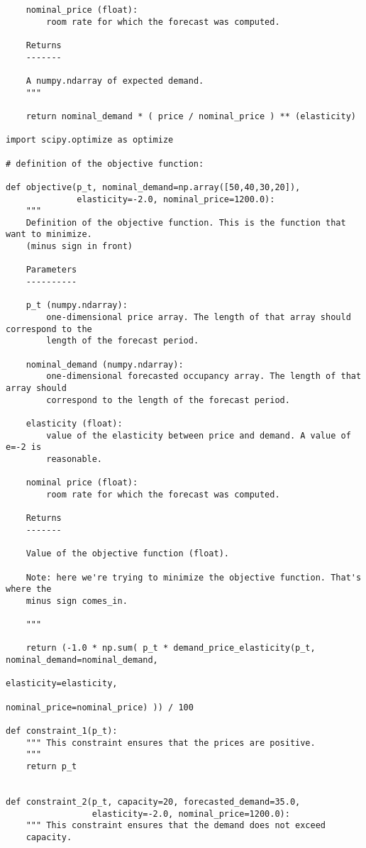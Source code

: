 \begin{verbatim}
    nominal_price (float):
        room rate for which the forecast was computed.

    Returns
    -------

    A numpy.ndarray of expected demand.
    """

    return nominal_demand * ( price / nominal_price ) ** (elasticity)

import scipy.optimize as optimize

# definition of the objective function:

def objective(p_t, nominal_demand=np.array([50,40,30,20]),
              elasticity=-2.0, nominal_price=1200.0):
    """
    Definition of the objective function. This is the function that want to minimize.
    (minus sign in front)

    Parameters
    ----------

    p_t (numpy.ndarray):
        one-dimensional price array. The length of that array should correspond to the
        length of the forecast period.

    nominal_demand (numpy.ndarray):
        one-dimensional forecasted occupancy array. The length of that array should
        correspond to the length of the forecast period.

    elasticity (float):
        value of the elasticity between price and demand. A value of e=-2 is
        reasonable.

    nominal price (float):
        room rate for which the forecast was computed.

    Returns
    -------

    Value of the objective function (float).

    Note: here we're trying to minimize the objective function. That's where the
    minus sign comes_in.

    """

    return (-1.0 * np.sum( p_t * demand_price_elasticity(p_t, nominal_demand=nominal_demand,
                                                        elasticity=elasticity,
                                                        nominal_price=nominal_price) )) / 100

def constraint_1(p_t):
    """ This constraint ensures that the prices are positive.
    """
    return p_t


def constraint_2(p_t, capacity=20, forecasted_demand=35.0,
                 elasticity=-2.0, nominal_price=1200.0):
    """ This constraint ensures that the demand does not exceed
    capacity.


\end{verbatim}
